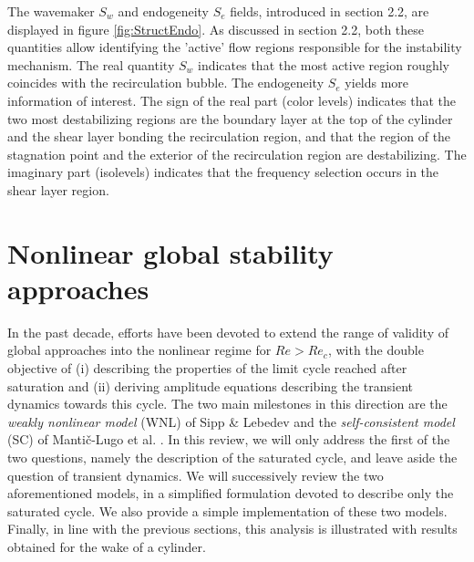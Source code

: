 \documentclass[twocolumn,10pt]{asme2ej}
\begin{document}
The wavemaker $S_w$ and endogeneity $S_e$ fields, introduced in section 2.2, are displayed in figure \ref{fig:StructEndo}.
As discussed in section 2.2, both these quantities allow identifying the 'active' flow regions responsible for the instability mechanism.
The real quantity $S_w$ indicates that the most active region roughly coincides with the recirculation bubble.
The endogeneity $S_e$ yields more information of interest.
The sign of the real part (color levels) indicates that the two most destabilizing regions are the boundary layer at the top of the cylinder and the shear layer bonding the recirculation region, and that the region of the stagnation point and the exterior of the recirculation region are destabilizing.
The imaginary part (isolevels) indicates that the frequency selection occurs in the shear layer region.

\section{Nonlinear global stability approaches}
\vspace{.2cm}



In the past decade, efforts have been devoted to extend the range of validity of global approaches into the nonlinear regime for $Re>Re_c$, with the double objective of (i) describing the properties of the limit cycle reached after saturation and (ii) deriving amplitude equations describing the transient dynamics towards this cycle.
The two main milestones in this direction are the {\em weakly nonlinear model} (WNL) of Sipp \& Lebedev \cite{SippLebedev} and the {\em self-consistent model} (SC) of Manti\v{c}-Lugo et al. \cite{MLugo2014}.
In this review, we will only address the first of the two questions, namely  the description of the saturated cycle, and leave aside the question of transient dynamics. We will successively review the two aforementioned models, in a simplified formulation devoted to describe only the saturated cycle. We also provide a simple implementation of these two models. Finally, in line with the previous sections, this analysis is illustrated with results obtained for the wake of a cylinder.
  
\end{document}
